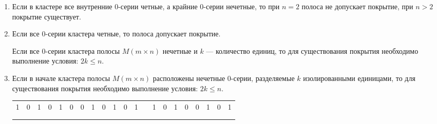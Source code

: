 \begin{enumerate}
Исходную полосу $M$ всегда можно преобразовать к <<стандартному представлению>> --- эквивалентной полосе (т.е. к полосе, которая покрывается или не покрывается плитками одновременно с исходной полосой), где в кластере из каждой нечетной 1-серии клеток сохраняется лишь одна \textit {изолированная}  клетка, крайняя для 1-серии.

\item
Если в кластере все внутренние 0-серии четные, а крайние 0-серии нечетные, то при $n=2$ полоса не допускает покрытие, при $n>2$ покрытие существует.
\item
Если все 0-серии кластера четные, то полоса допускает покрытие. 

Если все 0-серии кластера полосы $M (m\times n)$ нечетные и $k$ ---  количество единиц, то
 для существования покрытия необходимо выполнение условия: $2k\leq n$.
\item
Если в начале кластера полосы $M (m\times n)$ расположены нечетные 0-серии, разделяемые $k$ изолированными единицами, то
 для существования покрытия необходимо выполнение условия: $2k\leq n$.
\par\medskip
\begin{minipage}[t]{0.99\hsize}
\begin{tabular}
{
|c|c|c|c|c|c|c|c|c|c|c|c|c|c|c|c|c|c|c|c|c|
}
\cline{1-1} \cline{3-3} \cline{5-5} \cline{8-8} \cline{10-10} \cline{12-12}
\cline{14-14} \cline{16-16} \cline{19-19} \cline{21-21}
1&0&1&0&1&0&0&1&0&1&0&1&&1&0&1&0&0&1&0&1\\
\cline{2-2} \cline{4-4} \cline{6-7} \cline{9-9} \cline{11-11} \cline{15-15}
\cline{17-18} \cline{20-20} 
&&&&&\cellcolor[gray]{0.7}&\cellcolor[gray]{0.7}&&&&&&& &&&\cellcolor[gray]{0.7}&\cellcolor[gray]{0.7}&&&\\
\cline{1-1} \cline{3-3} \cline{5-5} \cline{8-8} \cline{10-10} \cline{12-12}
\cline{14-14} \cline{16-19} \cline{21-21}
&&&&\cellcolor[gray]{0.7}&\cellcolor[gray]{0.7}&\cellcolor[gray]{0.7}&\cellcolor[gray]{0.7}&&&&&& &&\cellcolor[gray]{0.7}&\cellcolor[gray]{0.7}&\cellcolor[gray]{0.7}&\cellcolor[gray]{0.7}&&\\


\end{tabular}
\end{minipage}
\end{enumerate}
